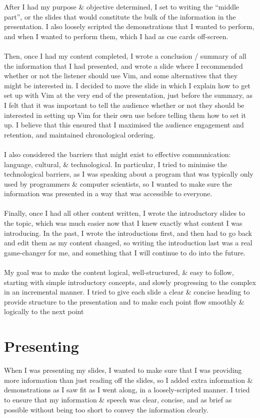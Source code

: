 \documentclass[a4paper]{article}
\begin{document}
After I had my purpose \& objective determined, I set to writing the ``middle part'', or the slides that would
constitute the bulk of the information in the presentation.
I also loosely scripted the demonstrations that I wanted to perform, and when I wanted to perform them, which I had as
cue cards off-screen.
\\\\
Then, once I had my content completed, I wrote a conclusion / summary of all the information that I had presented, and
wrote a slide where I recommended whether or not the listener should use Vim, and some alternatives that they might be
interested in.
I decided to move the slide in which I explain how to get set up with Vim at the very end of the presentation, just
before the summary, as I felt that it was important to tell the audience whether or not they should be interested in
setting up Vim for their own use before telling them how to set it up.
I believe that this ensured that I maximised the audience engagement and retention, and maintained chronological
ordering.
\\\\
I also considered the barriers that might exist to effective communication: language, cultural, \& technological.
In particular, I tried to minimise the technological barriers, as I was speaking about a program that was typically only
used by programmers \& computer scientists, so I wanted to make sure the information was presented in a way that was
accessible to everyone.
\\\\
Finally, once I had all other content written, I wrote the introductory slides to the topic, which was much easier now
that I knew exactly what content I was introducing.
In the past, I wrote the introductions first, and then had to go back and edit them as my content changed, so writing
the introduction last was a real game-changer for me, and something that I will continue to do into the future.
\\\\
My goal was to make the content logical, well-structured, \& easy to follow, starting with simple introductory concepts,
and slowly progressing to the complex in an incremental manner.
I tried to give each slide a clear \& concise heading to provide structure to the presentation and to make each point
flow smoothly \& logically to the next point

\section{Presenting}
When I was presenting my slides, I wanted to make sure that I was providing more information than just reading off the
slides, so I added extra information \& demonstrations as I saw fit as I went along, in a loosely-scripted manner.
I tried to ensure that my information \& speech was clear, concise, and as brief as possible without being too short to
convey the information clearly.
\end{document}
